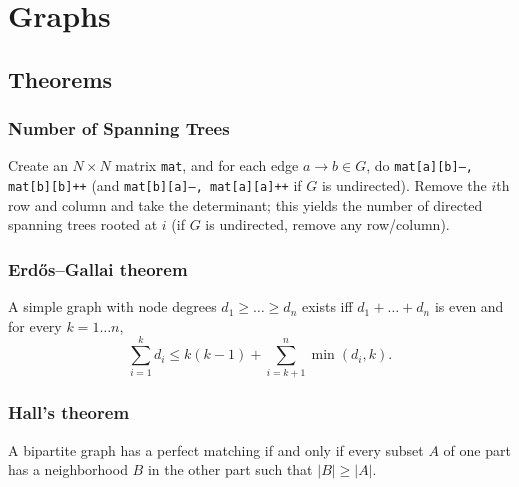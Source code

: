 \chapter{Graphs}

\section{Theorems}

\subsection{Number of Spanning Trees}
		Create an $N\times N$ matrix \texttt{mat}, and for each edge $a \rightarrow b \in G$, do
		\texttt{mat[a][b]--, mat[b][b]++} (and \texttt{mat[b][a]--, mat[a][a]++} if $G$ is undirected).
		Remove the $i$th row and column and take the determinant; this yields the number of directed spanning trees rooted at $i$
		(if $G$ is undirected, remove any row/column).

\subsection{Erdős–Gallai theorem}
		A simple graph with node degrees $d_1 \ge \dots \ge d_n$ exists iff $d_1 + \dots + d_n$ is even and for every $k = 1\dots n$,
		\[ \sum _{i=1}^{k}d_{i}\leq k(k-1)+\sum _{i=k+1}^{n}\min(d_{i},k). \]


\subsection{Hall's theorem}
A bipartite graph has a perfect matching if and only if every subset $A$ of one part has a neighborhood $B$ in the other part such that $|B| \ge |A|$.

